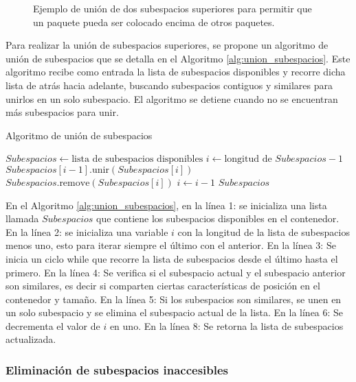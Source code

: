 \begin{figure}[H]
    \centering
    
    \caption{Ejemplo de unión de dos subespacios superiores para permitir que un paquete pueda ser colocado encima de otros paquetes.}
    \label{fig:union_subespacios}
\end{figure}

Para realizar la unión de subespacios superiores, se propone un algoritmo de unión de subespacios que se detalla en el Algoritmo \ref{alg:union_subespacios}. Este algoritmo recibe como entrada la lista de subespacios disponibles y recorre dicha lista de atrás hacia adelante, buscando subespacios contiguos y similares para unirlos en un solo subespacio. El algoritmo se detiene cuando no se encuentran más subespacios para unir.

\begin{algorithm}[H]
\caption{Algoritmo de unión de subespacios}
\label{alg:union_subespacios}
\begin{algorithmic}[1]
    \State $Subespacios \gets \text{lista de subespacios disponibles}$
    \State $i \gets \text{longitud de } Subespacios - 1$
            \State $Subespacios[i-1].\text{unir}(Subespacios[i])$
            \State $Subespacios.\text{remove}(Subespacios[i])$
        \EndIf
        \State $i \gets i - 1$
    \EndWhile
    \State \Return $Subespacios$
\end{algorithmic}
\end{algorithm}

En el Algoritmo \ref{alg:union_subespacios}, en la línea 1: se inicializa una lista llamada $Subespacios$ que contiene los subespacios disponibles en el contenedor. En la línea 2: se inicializa una variable $i$ con la longitud de la lista de subespacios menos uno, esto para iterar siempre el último con el anterior. En la línea 3: Se inicia un ciclo while que recorre la lista de subespacios desde el último hasta el primero. En la línea 4: Se verifica si el subespacio actual y el subespacio anterior son similares, es decir si comparten ciertas características de posición en el contenedor y tamaño. En la línea 5: Si los subespacios son similares, se unen en un solo subespacio y se elimina el subespacio actual de la lista. En la línea 6: Se decrementa el valor de $i$ en uno. En la línea 8: Se retorna la lista de subespacios actualizada.

\subsubsection{Eliminación de subespacios inaccesibles}

